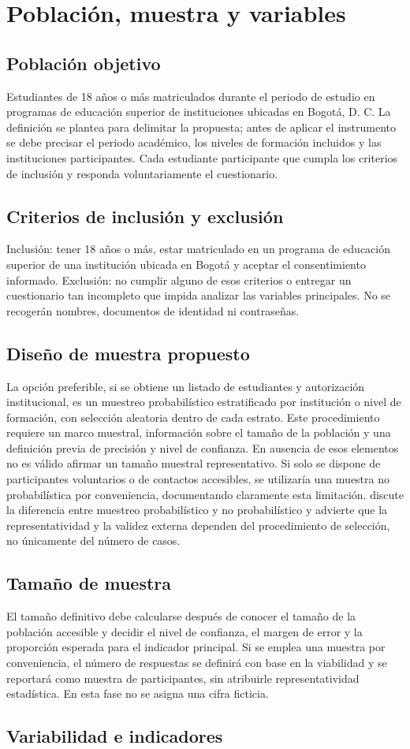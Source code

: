\section{Población, muestra y variables}
\subsection{Población objetivo}
Estudiantes de 18 años o más matriculados durante el periodo de estudio en programas de educación superior de instituciones ubicadas en Bogotá, D. C. La definición se plantea para delimitar la propuesta; antes de aplicar el instrumento se debe precisar el periodo académico, los niveles de formación incluidos y las instituciones participantes. Cada estudiante participante que cumpla los criterios de inclusión y responda voluntariamente el cuestionario.
\subsection{Criterios de inclusión y exclusión}
Inclusión: tener 18 años o más, estar matriculado en un programa de educación superior de una institución ubicada en Bogotá y aceptar el consentimiento informado. Exclusión: no cumplir alguno de esos criterios o entregar un cuestionario tan incompleto que impida analizar las variables principales. No se recogerán nombres, documentos de identidad ni contraseñas.
\subsection{Diseño de muestra propuesto}
La opción preferible, si se obtiene un listado de estudiantes y autorización institucional, es un muestreo probabilístico estratificado por institución o nivel de formación, con selección aleatoria dentro de cada estrato. Este procedimiento requiere un marco muestral, información sobre el tamaño de la población y una definición previa de precisión y nivel de confianza. En ausencia de esos elementos no es válido afirmar un tamaño muestral representativo.
Si solo se dispone de participantes voluntarios o de contactos accesibles, se utilizaría una muestra no probabilística por conveniencia, documentando claramente esta limitación. \textcite{argibay2009muestra} discute la diferencia entre muestreo probabilístico y no probabilístico y advierte que la representatividad y la validez externa dependen del procedimiento de selección, no únicamente del número de casos.
\subsection{Tamaño de muestra}
El tamaño definitivo debe calcularse después de conocer el tamaño de la población accesible y decidir el nivel de confianza, el margen de error y la proporción esperada para el indicador principal. Si se emplea una muestra por conveniencia, el número de respuestas se definirá con base en la viabilidad y se reportará como muestra de participantes, sin atribuirle representatividad estadística. En esta fase no se asigna una cifra ficticia.
\newpage
\subsection{Variabilidad e indicadores}
